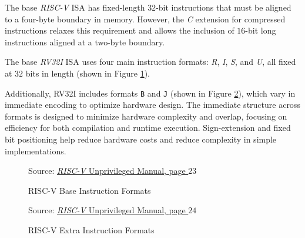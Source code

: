 The base \textit{RISC-V} ISA has fixed-length $32$-bit instructions that must be
aligned to a four-byte boundary in memory. However, the \textit{C} extension for
compressed instructions relaxes this requirement and allows the inclusion of
$16$-bit long instructions aligned at a two-byte boundary.

The base \textit{RV32I} ISA uses four main instruction formats: \textit{R},
\textit{I}, \textit{S}, and \textit{U}, all fixed at $32$ bits in length (shown in
Figure \ref{fig:instrformats}).

Additionally, RV32I includes formats \texttt{B} and \texttt{J} (shown in Figure
\ref{fig:extrainstrformats}), which vary in immediate encoding to optimize
hardware design. The immediate structure across formats is designed to minimize hardware
complexity and overlap, focusing on efficiency for both compilation and runtime
execution. Sign-extension and fixed bit positioning help reduce hardware costs and
reduce complexity in simple implementations.
\begin{figure}[htbp]
  \centering
  \def\stackalignment{r}
  {\scriptsize Source: \href{https://drive.google.com/file/d/1uviu1nH-tScFfgrovvFCrj7Omv8tFtkp/view}{\textit{RISC-V} Unprivileged Manual, page $23$}}
  \caption{RISC-V Base Instruction Formats}
  \label{fig:instrformats}
\end{figure}

\begin{figure}[htbp]
  \centering
  \def\stackalignment{r} %
  {\scriptsize Source: \href{https://drive.google.com/file/d/1uviu1nH-tScFfgrovvFCrj7Omv8tFtkp/view}{\textit{RISC-V} Unprivileged Manual, page $24$}}
  \caption{RISC-V Extra Instruction Formats}
  \label{fig:extrainstrformats}
\end{figure}

